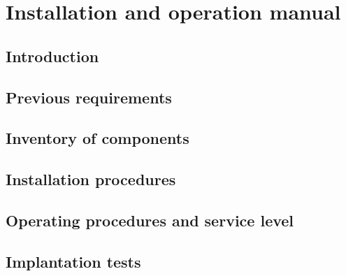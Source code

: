\chapter{Installation and operation manual}
\section{Introduction}

\section{Previous requirements}

\section{Inventory of components}

\section{Installation procedures}

\section{Operating procedures and service level}

\section{Implantation tests}